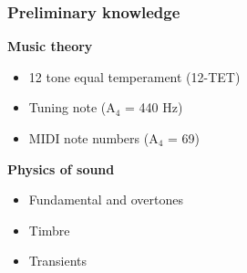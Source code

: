 \documentclass[table]{beamer}
\newcommand{\notee}[2]{#1${}_{#2}$}
\begin{document}
\begin{frame}
\frametitle{Preliminary knowledge}
    {\large \textbf{Music theory}}
    \begin{itemize}
        \item 12 tone equal temperament (12-TET)
        \item Tuning note (\notee{A}{4} = 440 Hz)
        \item MIDI note numbers (\notee{A}{4} = 69)
    \end{itemize}
    \bigskip

    {\large \textbf{Physics of sound}}
    \begin{itemize}
        \item Fundamental and overtones
        \item Timbre
        \item Transients
    \end{itemize}
\end{frame}
\end{document}
